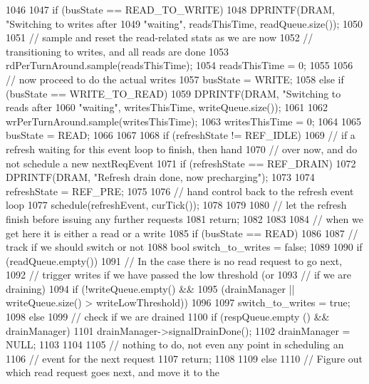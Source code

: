 \begin{DoxyCode}
1046 {
1047     if (busState == READ_TO_WRITE) {
1048         DPRINTF(DRAM, "Switching to writes after %
1049                 "waiting\n", readsThisTime, readQueue.size());
1050 
1051         // sample and reset the read-related stats as we are now
1052         // transitioning to writes, and all reads are done
1053         rdPerTurnAround.sample(readsThisTime);
1054         readsThisTime = 0;
1055 
1056         // now proceed to do the actual writes
1057         busState = WRITE;
1058     } else if (busState == WRITE_TO_READ) {
1059         DPRINTF(DRAM, "Switching to reads after %
1060                 "waiting\n", writesThisTime, writeQueue.size());
1061 
1062         wrPerTurnAround.sample(writesThisTime);
1063         writesThisTime = 0;
1064 
1065         busState = READ;
1066     }
1067 
1068     if (refreshState != REF_IDLE) {
1069         // if a refresh waiting for this event loop to finish, then hand
1070         // over now, and do not schedule a new nextReqEvent
1071         if (refreshState == REF_DRAIN) {
1072             DPRINTF(DRAM, "Refresh drain done, now precharging\n");
1073 
1074             refreshState = REF_PRE;
1075 
1076             // hand control back to the refresh event loop
1077             schedule(refreshEvent, curTick());
1078         }
1079 
1080         // let the refresh finish before issuing any further requests
1081         return;
1082     }
1083 
1084     // when we get here it is either a read or a write
1085     if (busState == READ) {
1086 
1087         // track if we should switch or not
1088         bool switch_to_writes = false;
1089 
1090         if (readQueue.empty()) {
1091             // In the case there is no read request to go next,
1092             // trigger writes if we have passed the low threshold (or
1093             // if we are draining)
1094             if (!writeQueue.empty() &&
1095                 (drainManager || writeQueue.size() > writeLowThreshold)) {
1096 
1097                 switch_to_writes = true;
1098             } else {
1099                 // check if we are drained
1100                 if (respQueue.empty () && drainManager) {
1101                     drainManager->signalDrainDone();
1102                     drainManager = NULL;
1103                 }
1104 
1105                 // nothing to do, not even any point in scheduling an
1106                 // event for the next request
1107                 return;
1108             }
1109         } else {
1110             // Figure out which read request goes next, and move it to the
}}}
\end{DoxyCode}
